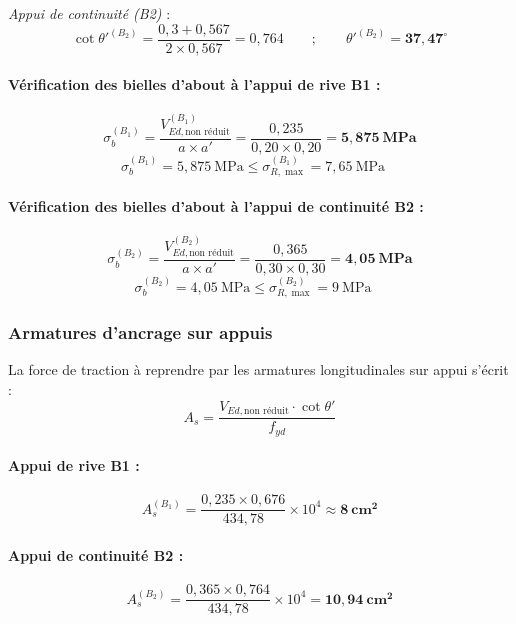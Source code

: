 \textit{Appui de continuité (B2)} :
\[
  \cot\theta'^{(B_2)} = \frac{0{,}3 + 0{,}567}{2 \times 0{,}567}
                    = 0{,}764
  \qquad ; \qquad
  \theta'^{(B_2)} = \mathbf{37{,}47^\circ}
\]

\paragraph{Vérification des bielles d'about à l'appui de rive B1 :}
\[
  \sigma_b^{(B_1)} = \frac{V_{Ed,\text{non réduit}}^{(B_1)}}{a \times a'}
                  = \frac{0{,}235}{0{,}20 \times 0{,}20}
                  = \mathbf{5{,}875~\text{MPa}}
\]
\[
  \sigma_b^{(B_1)} = 5{,}875~\text{MPa} \leq \sigma_{R,\max}^{(B_1)} = 7{,}65~\text{MPa} \quad
\]

\paragraph{Vérification des bielles d'about à l'appui de continuité B2 :}
\[
  \sigma_b^{(B_2)} = \frac{V_{Ed,\text{non réduit}}^{(B_2)}}{a \times a'}
                  = \frac{0{,}365}{0{,}30 \times 0{,}30}
                  = \mathbf{4{,}05~\text{MPa}}
\]
\[
  \sigma_b^{(B_2)} = 4{,}05~\text{MPa} \leq \sigma_{R,\max}^{(B_2)} = 9~\text{MPa} \quad
\]

\subsubsection{Armatures d'ancrage sur appuis}

La force de traction à reprendre par les armatures longitudinales sur appui s'écrit :
\[
  A_s = \frac{V_{Ed,\text{non réduit}} \cdot \cot\theta'}{f_{yd}}
\]

\paragraph{Appui de rive B1 :}
\[
  A_s^{(B_1)} = \frac{0{,}235 \times 0{,}676}{434{,}78} \times 10^4 \approx \mathbf{8~\text{cm}^2}
\]


\paragraph{Appui de continuité B2 :}
\[
  A_s^{(B_2)} = \frac{0{,}365 \times 0{,}764}{434{,}78} \times 10^4 = \mathbf{10{,}94~\text{cm}^2}
\]


